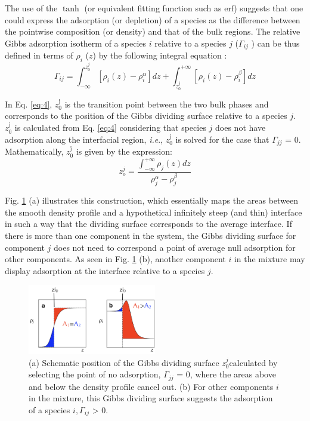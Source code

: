 \documentclass[9pt,tutorial]{livecoms}
\begin{document}
The use of the $\tanh$ (or equivalent fitting function such as $\mathrm{erf}$) suggests
that one could express the adsorption (or depletion) of a species as the
difference between the pointwise composition (or density) and that of the bulk
regions. The relative Gibbs adsorption isotherm of a species $i$
relative to a species $j$ (${\Gamma}_{ij}$ ) can be thus defined in
terms of ${\rho}_{i}$ ($z$) by the following integral
equation \citep{rowlinson1982}:
\begin{equation}
\varGamma_{ij}=\int_{-\infty}^{z_{0}^{j}}\left[\rho_{i}\left(z\right)-\rho{}_{i}^{\alpha}\right]dz+\int_{z_{0}^{j}}^{+\infty}\left[\rho_{i}\left(z\right)-\rho{}_{i}^{\beta}\right]dz
 \label{eq:4}
\end{equation}

In Eq. \ref{eq:4}, $z_{0}^{\mathrm{j}}$ is the transition point between the two bulk
phases and corresponds to the position of the Gibbs dividing surface relative
to a species $j$. $z_{0}^{\mathrm{j}}$ is calculated from Eq. \ref{eq:4}
considering that species $j$ does not have adsorption along the
interfacial region, \textit{i.e}., $z_{0}^{\mathrm{j}}$ is solved for the
case that ${\Gamma}_{jj}$ = 0. Mathematically, $z_{0}^{\mathrm{j}}$ is
given by the expression:
\begin{equation}
z_{o}^{j}=\frac{\int_{-\infty}^{+\infty}\rho_{j}\left(z\right)dz}{\rho_{j}^{\alpha}-\rho_{j}^{\beta}}
\end{equation}

Fig. \ref{fig:4} (a) illustrates this construction, which essentially maps the areas
between the smooth density profile and a hypothetical infinitely steep (and
thin) interface in such a way that the dividing surface corresponds to the
average interface. If there is more than one component in the system, the
Gibbs dividing surface for component $j$ does not need to correspond
a point of average null adsorption for other components. As seen in Fig. \ref{fig:4} (b),
another component $i$ in the mixture may display adsorption at the
interface relative to a species $j.$

\begin{figure}
\includegraphics[width=0.5\textwidth]{gfx/image11.png}
\caption{(a) Schematic position of the Gibbs dividing surface $z^{j}_{0 }$calculated by selecting the point of no adsorption, ${\Gamma}_{jj}$ = 0, where the areas above and below the density profile cancel out. (b) For other components $i$  in the mixture, this Gibbs dividing surface suggests the adsorption of a species $i,{\Gamma}_{ij}$ {\textgreater} 0.}
\label{fig:4}
\end{figure}
\end{document}
